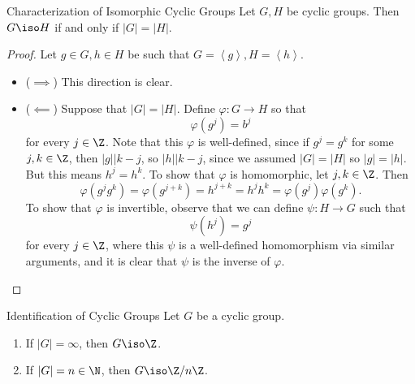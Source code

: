 \documentclass[pmath347]{subfiles}
\begin{document}
    \begin{prop}{Characterization of Isomorphic Cyclic Groups}
        Let $G,H$ be cyclic groups. Then $G\iso H$ if and only if $\left| G \right| = \left| H \right| $.
    \end{prop}
    
    \begin{proof}
        Let $g\in G, h\in H$ be such that $G=\left< g \right> , H = \left< h \right>$.   
        \begin{itemize}
            \item ($\implies$) This direction is clear. \qqqedsym
            \item ($\impliedby$) Suppose that $\left| G \right| = \left| H \right|$. Define $\varphi:G\to H$ so that
                \begin{equation*}
                    \varphi\left( g^j \right) = b^j
                \end{equation*}
                for every $j\in\Z$. Note that this $\varphi$ is well-defined, since if $g^j = g^k$ for some $j,k\in\Z$, then $\left| g \right| | k-j$, so $\left| h \right| | k-j$, since we assumed $\left| G \right| = \left| H \right| $ so $\left| g \right| = \left| h \right|$. But this means $h^j = h^k$. To show that $\varphi$ is homomorphic, let $j,k\in\Z$. Then
                \begin{equation*}
                    \varphi\left( g^jg^k \right) = \varphi\left( g^{j+k} \right) = h^{j+k} = h^jh^k = \varphi\left( g^j \right) \varphi\left( g^k \right) .
                \end{equation*}
                To show that $\varphi$ is invertible, observe that we can define $\psi: H\to G$ such that
                \begin{equation*}
                    \psi\left( h^j \right) = g^j
                \end{equation*}
                for every $j\in\Z$, where this $\psi$ is a well-defined homomorphism via similar arguments, and it is clear that $\psi$ is the inverse of $\varphi$. \qqedsym
        \end{itemize} 
    \end{proof}
    
    \clearpage
    \begin{cor}{Identification of Cyclic Groups}
        Let $G$ be a cyclic group.
        \begin{enumerate}
            \item If $\left| G \right| = \infty$, then $G\iso\Z$.
            \item If $\left| G \right| = n\in\N$, then $G\iso \Z /n\Z$.
        \end{enumerate}
    \end{cor}	
\end{document}
